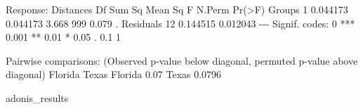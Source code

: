 \documentclass[
]{book}
\newenvironment{Shaded}{\begin{snugshade}}{\end{snugshade}}
\newcommand{\NormalTok}[1]{#1}
\begin{document}
\begin{Shaded}
\begin{Highlighting}[]
\NormalTok{Response: Distances}
\NormalTok{          Df   Sum Sq  Mean Sq     F N.Perm Pr(\textgreater{}F)  }
\NormalTok{Groups     1 0.044173 0.044173 3.668    999  0.079 .}
\NormalTok{Residuals 12 0.144515 0.012043                      }
\NormalTok{{-}{-}{-}}
\NormalTok{Signif. codes:  0 \textquotesingle{}***\textquotesingle{} 0.001 \textquotesingle{}**\textquotesingle{} 0.01 \textquotesingle{}*\textquotesingle{} 0.05 \textquotesingle{}.\textquotesingle{} 0.1 \textquotesingle{} \textquotesingle{} 1}

\NormalTok{Pairwise comparisons:}
\NormalTok{(Observed p{-}value below diagonal, permuted p{-}value above diagonal)}
\NormalTok{        Florida Texas}
\NormalTok{Florida          0.07}
\NormalTok{Texas    0.0796      }
\end{Highlighting}
\end{Shaded}

\begin{Shaded}
\begin{Highlighting}[]
\NormalTok{adonis\_results}
\end{Highlighting}
\end{Shaded}
\end{document}
